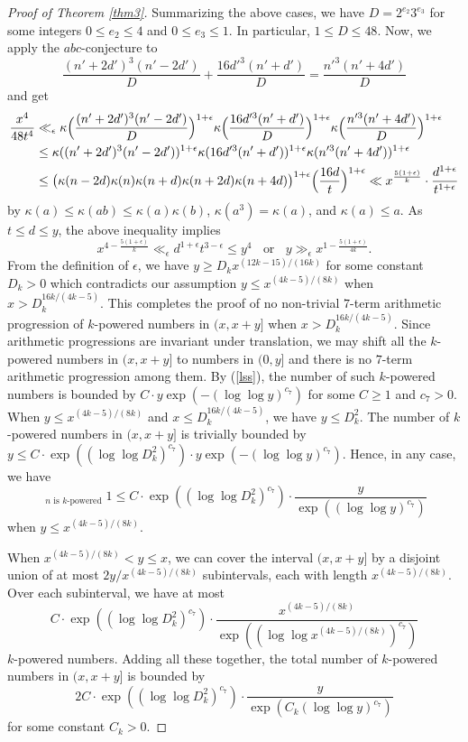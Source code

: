 \documentclass[12pt]{article}
\begin{document}
\begin{proof}[Proof of Theorem \ref{thm3}]
Summarizing the above cases, we have $D = 2^{e_2} 3^{e_3}$ for some integers $0 \le e_2 \le 4$ and $0 \le e_3 \le 1$. In particular, $1 \le D \le 48$. Now, we apply the $abc$-conjecture to
\[
\frac{(n' + 2d')^3 (n' - 2d')}{D} + \frac{16 d'^3 (n' + d')}{D} = \frac{n'^3 (n' + 4d')}{D}
\]
and get
\begin{align*}
\frac{x^4}{48 t^4} &\ll_\epsilon \kappa\Bigl(\frac{(n' + 2d')^3 (n' - 2d')}{D} \Bigr)^{1 + \epsilon} \kappa\Bigl(\frac{16 d'^3 (n' + d')}{D} \Bigr)^{1 + \epsilon} \kappa\Bigl(\frac{n'^3 (n' + 4d')}{D} \Bigr)^{1 + \epsilon} \\
&\le \kappa ( (n' + 2d')^3 (n' - 2d') )^{1 + \epsilon} \kappa (16 d'^3 (n' + d') )^{1 + \epsilon} \kappa( n'^3 (n' + 4d'))^{1 + \epsilon} \\
&\le \bigl( \kappa(n - 2d) \kappa(n) \kappa(n + d) \kappa(n + 2d) \kappa(n + 4d) \bigr)^{1 + \epsilon} \Bigl( \frac{16 d}{t} \Bigr)^{1 + \epsilon} \ll x^{\frac{5 (1 + \epsilon)}{k}} \cdot \frac{d^{1 + \epsilon}}{t^{1 + \epsilon}}
\end{align*}
by $\kappa(a) \le \kappa(a b) \le \kappa(a) \kappa(b)$, $\kappa(a^3) = \kappa(a)$, and $\kappa(a) \le a$. As $t \le d \le y$, the above inequality implies
\[
x^{4 - \frac{5 (1 + \epsilon)}{k}} \ll_\epsilon d^{1+\epsilon} t^{3 - \epsilon} \le y^4 \; \; \text{ or } \; \; y \gg_\epsilon x^{1 - \frac{5 (1 + \epsilon)}{4 k}}.
\]
From the definition of $\epsilon$, we have $y \ge D_k x^{(12 k - 15)/(16 k)}$ for some constant $D_k > 0$ which contradicts our assumption $y \le x^{(4k - 5)/(8k)}$ when $x > D_k^{16k/(4k - 5)}$. This completes the proof of no non-trivial $7$-term arithmetic progression of $k$-powered numbers in $(x, x + y]$ when $x > D_k^{16k/(4k - 5)}$. Since arithmetic progressions are invariant under translation, we may shift all the $k$-powered numbers in $(x, x+y]$ to numbers in $(0, y]$ and there is no $7$-term arithmetic progression among them. By (\ref{lss}), the number of such $k$-powered numbers is bounded by $C \cdot y \exp( - (\log \log y)^{c_7})$ for some $C \ge 1$ and $c_7 > 0$. When $y \le x^{(4k - 5)/(8k)}$ and $x \le D_k^{16k/(4k - 5)}$, we have $y \le D_k^2$. The number of $k$-powered numbers in $(x, x + y]$ is trivially bounded by $y \le C \cdot \exp((\log \log D_k^2)^{c_7}) \cdot y \exp( - (\log \log y)^{c_7})$. Hence, in any case, we have
\[
\mathop{\sum_{x < n \le x + y}}_{n \text{ is $k$-powered}} 1 \le C \cdot \exp((\log \log D_k^2)^{c_7}) \cdot \frac{y}{\exp( (\log \log y)^{c_7})}
\]
when $y \le x^{(4k - 5) / (8k)}$.

\bigskip

When $x^{(4k - 5)/(8k)} < y \le x$, we can cover the interval $(x, x + y]$ by a disjoint union of at most $2 y / x^{(4k - 5)/(8k)}$ subintervals, each with length $x^{(4k - 5)/(8k)}$. Over each subinterval, we have at most
\[
C \cdot \exp((\log \log D_k^2)^{c_7}) \cdot \frac{x^{(4k - 5)/(8k)}}{ \exp ( (\log \log x^{(4k - 5)/(8k)})^{c_7} ) } 
\]
$k$-powered numbers. Adding all these together, the total number of $k$-powered numbers in $(x, x + y]$ is bounded by 
\[
2 C \cdot \exp((\log \log D_k^2)^{c_7}) \cdot \frac{y}{ \exp ( C_k (\log \log y)^{c_7} )}
\]
for some constant $C_k > 0$.
\end{proof}
\end{document}
